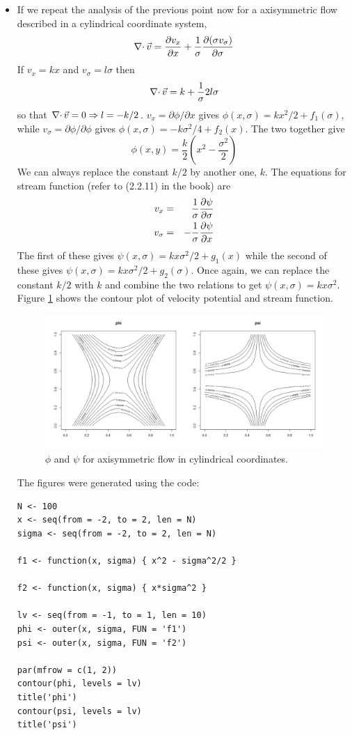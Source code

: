 \begin{itemize}
\item If we repeat the analysis of the previous point now for a axisymmetric flow described in a cylindrical coordinate system, 
\[
\operatorname{\nabla\cdot}{\vec{v}} = \frac{\partial{v_x}}{\partial{x}} + \frac{1}{\sigma}\frac{\partial{(\sigma v_\sigma)}}{\partial{\sigma}}
\]
If $v_x = kx$ and $v_\sigma = l\sigma$ then
\[
\operatorname{\nabla\cdot}{\vec{v}} = k + \frac{1}{\sigma}2l\sigma 
\]
so that $\operatorname{\nabla\cdot}{\vec{v}} = 0 \Rightarrow l = -k/2$. $v_x = \partial\phi/\partial x$ gives $\phi(x, \sigma) = kx^2/2 + f_1(\sigma)$, while $v_\sigma = \partial\phi/\partial\phi$ gives
$\phi(x, \sigma) = -k\sigma^2/4 + f_2(x)$. The two together give 
\[
\phi(x, y) = \frac{k}{2}\left(x^2 - \frac{\sigma^2}{2}\right)
\]
We can always replace the constant $k/2$ by another one, $k$. The equations for stream function (refer to (2.2.11) in the book) are
\begin{eqnarray*}
v_x &=& \frac{1}{\sigma}\frac{\partial{\psi}}{\partial{\sigma}} \\
v_\sigma &=& -\frac{1}{\sigma}\frac{\partial{\psi}}{\partial{x}}
\end{eqnarray*}
The first of these gives $\psi(x, \sigma) = kx\sigma^2/2 + g_1(x)$ while the second of these gives $\psi(x, \sigma) = kx\sigma^2/2 + g_2(\sigma)$. Once again, we can replace the constant
$k/2$ with $k$ and combine the two relations to get $\psi(x, \sigma) = kx\sigma^2$. Figure \ref{c2f9} shows the contour plot of velocity potential and stream function.
\begin{figure}[!ht]
\centering
\centerline{\includegraphics[scale=0.25]{c2f9}}
\caption{$\phi$ and $\psi$ for axisymmetric flow in cylindrical coordinates.}
\label{c2f9}
\end{figure}
The figures were generated using the code:
\begin{verbatim}
N <- 100
x <- seq(from = -2, to = 2, len = N)
sigma <- seq(from = -2, to = 2, len = N)

f1 <- function(x, sigma) { x^2 - sigma^2/2 }

f2 <- function(x, sigma) { x*sigma^2 }

lv <- seq(from = -1, to = 1, len = 10)
phi <- outer(x, sigma, FUN = 'f1')
psi <- outer(x, sigma, FUN = 'f2')

par(mfrow = c(1, 2))
contour(phi, levels = lv)
title('phi')
contour(psi, levels = lv)
title('psi')
\end{verbatim}
\end{itemize}

